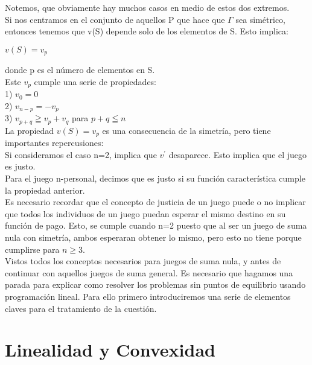 \documentclass[10pt,a4paper]{book}
\begin{document}
Notemos, que obviamente hay muchos casos en medio de estos dos extremos.\\

Si nos centramos en el conjunto de aquellos P que hace que $\Gamma$ sea simétrico, entonces tenemos que v(S) depende solo de los elementos de S. Esto implica:\\

\begin{center}

$v(S)=v_p$

\end{center}

donde p es el número de elementos en S.\\

Este $v_p$ cumple una serie de propiedades:\\

1) $v_0=0$\\
2) $v_{n-p}=-v_p$\\
3) $v_{p+q} \geqq v_p + v_q$ para $p + q \leqq n $\\

La propiedad $v(S)=v_p$ es una consecuencia de la simetría, pero tiene importantes repercusiones:\\

Si consideramos el caso n=2, implica que $v^{'}$ desaparece. Esto implica que el juego es justo.\\
Para el juego n-personal, decimos que es justo si su función característica cumple la propiedad anterior. \\
Es necesario recordar que el concepto de justicia de un juego puede o no implicar que todos los individuos de un juego puedan esperar el mismo destino en su función de pago. Esto, se cumple cuando n=2 puesto que al ser un juego de suma nula con simetría, ambos esperaran obtener lo mismo, pero esto no tiene porque cumplirse para $ n \geq 3$.\\

Vistos todos los conceptos necesarios para juegos de suma nula, y antes de continuar con aquellos juegos de suma general. Es necesario que hagamos una parada para explicar como resolver los problemas sin puntos de equilibrio usando programación lineal. Para ello primero introduciremos una serie de elementos claves para el tratamiento de la cuestión.\\



\chapter{Linealidad y Convexidad}
\end{document}
